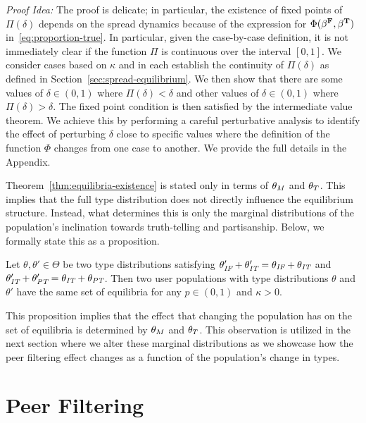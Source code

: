 \textit{Proof Idea:} The proof is delicate; in particular, the existence of fixed points of $\Pi(\delta)$ depends on the spread dynamics because of the expression for $\Phi(\beta^\false, \beta^\true)$ in~\eqref{eq:proportion-true}.  In particular, given the case-by-case definition, it is not immediately clear if the function $\Pi$ is continuous over the interval $[0,1]$. We consider cases based on $\kappa$ and in each establish the  continuity of $\Pi(\delta)$ as defined in Section~\ref{sec:spread-equilibrium}. We then show that there are some values of $\delta \in (0, 1) $ where $\Pi(\delta) < \delta$ and other values of $\delta \in (0, 1) $ where $\Pi(\delta) > \delta$. The fixed point condition is then satisfied by the intermediate value theorem. We achieve this by performing a careful perturbative analysis to identify the effect of perturbing $\delta$ close to specific values where the definition of the function $\Phi$ changes from one case to another. We provide the full details in the Appendix.

Theorem~\ref{thm:equilibria-existence} is stated only in terms of $\tm$ and $\tt$. This implies that the full type distribution does not directly influence the equilibrium structure. Instead, what determines this is only the marginal distributions of the population's inclination towards truth-telling and partisanship.  Below, we formally state this as a proposition. 

\begin{proposition}
     Let $\theta, \theta' \in \Theta$ be two type distributions satisfying $\theta_{\IF}' + \theta_{\IT}' = \theta_{\IF} + \theta_{\IT}$  and $\theta_{\IT}' + \theta_{\PT}' = \theta_{\IT} + \theta_{\PT}$. Then two user populations with type distributions $\theta$ and $\theta'$ have the same set of equilibria for any $p \in (0,1)$ and $\kappa > 0 $. 
\end{proposition}

This proposition implies that the effect that changing the population has on the set of equilibria is determined by $\tm$ and $\tt$. This observation is utilized in the next section where we alter these marginal distributions as we showcase how the peer filtering effect changes as a function of the population's change in types.
\section{Peer Filtering}



